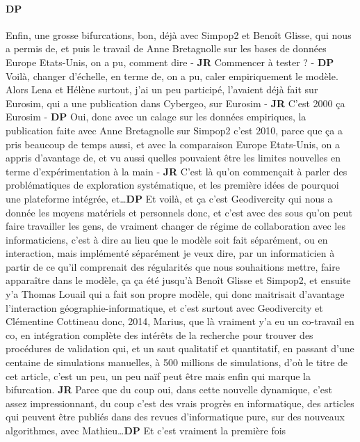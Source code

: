 \documentclass[12pt]{article}
\begin{document}
\paragraph{DP}

Enfin, une grosse bifurcations, bon, déjà avec Simpop2 et Benoît Glisse, qui nous a permis de, et puis le travail de Anne Bretagnolle sur les bases de données Europe Etats-Unis, on a pu, comment dire - \textbf{JR} Commencer à tester ? - \textbf{DP} Voilà, changer d'échelle, en terme de, on a pu, caler empiriquement le modèle. Alors Lena et Hélène surtout, j'ai un peu participé, l'avaient déjà fait sur Eurosim, qui a une publication dans Cybergeo, sur Eurosim - \textbf{JR} C'est 2000 ça Eurosim - \textbf{DP} Oui, donc avec un calage sur les données empiriques, la publication faite avec Anne Bretagnolle sur Simpop2 c'est 2010, parce que ça a pris beaucoup de temps aussi, et avec la comparaison Europe Etats-Unis, on a appris d'avantage de, et vu aussi quelles pouvaient être les limites nouvelles en terme d'expérimentation à la main - \textbf{JR} C'est là qu'on commençait à parler des problématiques de exploration systématique, et les première idées de pourquoi une plateforme intégrée, et\ldots \textbf{DP} Et voilà, et ça c'est Geodivercity qui nous a donnée les moyens matériels et personnels donc, et c'est avec des sous qu'on peut faire travailler les gens, de vraiment changer de régime de collaboration avec les informaticiens, c'est à dire au lieu que le modèle soit fait séparément, ou en interaction, mais implémenté séparément je veux dire, par un informaticien à partir de ce qu'il comprenait des régularités que nous souhaitions mettre, faire apparaître dans le modèle, ça ça été jusqu'à Benoît Glisse et Simpop2, et ensuite y'a Thomas Louail qui a fait son propre modèle, qui donc maitrisait d'avantage l'interaction géographie-informatique, et c'est surtout avec Geodivercity et Clémentine Cottineau donc, 2014, Marius, que là vraiment y'a eu un co-travail en co, en intégration complète des intérêts de la recherche pour trouver des procédures de validation qui, et un saut qualitatif et quantitatif, en passant d'une centaine de simulations manuelles, à 500 millions de simulations, d'où le titre de cet article, c'est un peu, un peu naïf peut être mais enfin qui marque la bifurcation. \textbf{JR} Parce que du coup oui, dans cette nouvelle dynamique, c'est assez impressionnant, du coup c'est des vrais progrès en informatique, des articles qui peuvent être publiés dans des revues d'informatique pure, sur des nouveaux algorithmes, avec Mathieu\ldots \textbf{DP} Et c'est vraiment la première fois %
\end{document}
